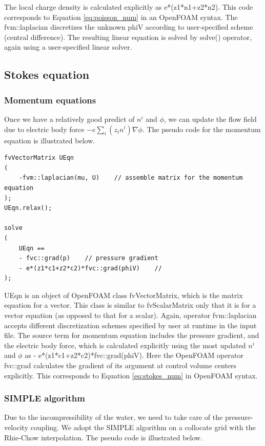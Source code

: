 The local charge density is calculated explicitly as \textsf{e*(z1*n1+z2*n2)}. This code corresponds to Equation \ref{eq:poisson_num} in an OpenFOAM syntax. The \textsf{fvm::laplacian} discretizes the unknown \textsf{phiV} according to user-specified scheme (central difference). The resulting linear equation is solved by \textsf{solve()} operator, again using a user-specified linear solver.

\subsection{Stokes equation}
\subsubsection{Momentum equations}
Once we have a relatively good predict of $n^i$ and $\phi$, we can update the flow field due to electric body force $-e\sum_i(z_in^i)\nabla\phi$. The pseudo code for the momentum equation is illustrated below.

\begin{lstlisting}
fvVectorMatrix UEqn
(
    -fvm::laplacian(mu, U)    // assemble matrix for the momentum equation
);
UEqn.relax();

solve
(
    UEqn == 
	- fvc::grad(p)    // pressure gradient 
	- e*(z1*c1+z2*c2)*fvc::grad(phiV)    //
);
\end{lstlisting}

\textsf{UEqn} is an object of OpenFOAM class \textsf{fvVectorMatrix}, which is the matrix equation for a vector. This class is similar to \textsf{fvScalarMatrix} only that it is for a vector equation (as opposed to that for a scalar). Again, operator \textsf{fvm::laplacian} accepts different discretization schemes specified by user at runtime in the input file. The source term for momentum equation includes the pressure gradient, and the electric body force, which is calculated explicitly using the most updated $n^i$ and $\phi$ as \textsf{- e*(z1*c1+z2*c2)*fvc::grad(phiV)}. Here the OpenFOAM operator \textsf{fvc::grad} calculates the gradient of its argument at control volume centers explicitly. This corresponds to Equation \ref{eq:stokes_num} in OpenFOAM syntax.

\subsubsection{SIMPLE algorithm}
Due to the incompressibility of the water, we need to take care of the pressure-velocity coupling. We adopt the SIMPLE algorithm on a collocate grid with the Rhie-Chow interpolation. The pseudo code is illustrated below.

